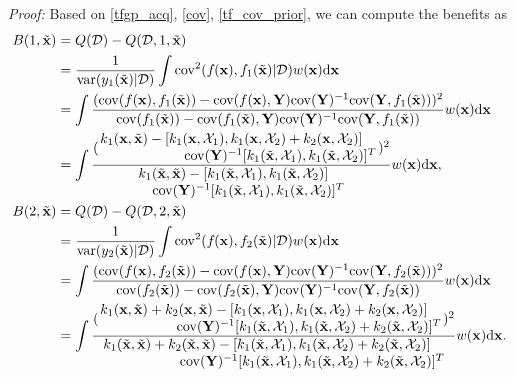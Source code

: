 \documentclass[11pt]{article}
\begin{document}
\textit{Proof:} 
Based on \eqref{tfgp_acq}, \eqref{cov}, \eqref{tf_cov_prior}, we can compute the benefits as
\begin{align}
    B(1, \tilde{\mathbf{x}})  & = Q(\mathcal{D}) - Q(\mathcal{D}, 1, \tilde{\mathbf{x}})
\nonumber \\
    & = \frac{1}{{\rm{var}}(y_1(\tilde{\mathbf{x}})|\mathcal{D})}\int {\rm{cov}}^2(f_{}(\mathbf{x}),f_1(\tilde{\mathbf{x}})|\mathcal{D}) w(\mathbf{x}) \mathrm{d} \mathbf{x}
\nonumber \\
    & = \int \frac{(\mathrm{cov}(f(\mathbf{x}), f_1(\tilde{\mathbf{x}}))-\mathrm{cov}(f(\mathbf{x}), \mathbf{Y})\mathrm{cov}(\mathbf{Y})^{-1} \mathrm{cov}(\mathbf{Y},f_1(\tilde{\mathbf{x}})))^2}
    {\mathrm{cov}(f_1(\tilde{\mathbf{x}})) - \mathrm{cov}(f_1(\tilde{\mathbf{x}}), \mathbf{Y})\mathrm{cov}(\mathbf{Y})^{-1} \mathrm{cov}(\mathbf{Y},f_1(\tilde{\mathbf{x}}))} 
    w(\mathbf{x}) \mathrm{d} \mathbf{x}
\nonumber \\
    & = \int \frac{(\splitfrac{k_1(\mathbf{x}, \tilde{\mathbf{x}})-[k_1(\mathbf{x}, \mathcal{X}_1), k_1(\mathbf{x}, \mathcal{X}_2)+k_2(\mathbf{x}, \mathcal{X}_2)]}{ \mathrm{cov}(\mathbf{Y})^{-1} [k_1(\tilde{\mathbf{x}}, \mathcal{X}_1), k_1(\tilde{\mathbf{x}}, \mathcal{X}_2)]^T})^2}
    {\splitfrac{k_1(\tilde{\mathbf{x}}, \tilde{\mathbf{x}}) - [k_1(\tilde{\mathbf{x}}, \mathcal{X}_1), k_1(\tilde{\mathbf{x}}, \mathcal{X}_2)]} {\mathrm{cov}(\mathbf{Y})^{-1} [k_1(\tilde{\mathbf{x}}, \mathcal{X}_1), k_1(\tilde{\mathbf{x}}, \mathcal{X}_2)]^T}}
    w(\mathbf{x}) \mathrm{d} \mathbf{x},
\\
    B(2, \tilde{\mathbf{x}})  & = Q(\mathcal{D}) - Q(\mathcal{D}, 2, \tilde{\mathbf{x}})
\nonumber \\
    & = \frac{1}{{\rm{var}}(y_2(\tilde{\mathbf{x}})|\mathcal{D})}\int {\rm{cov}}^2(f_{}(\mathbf{x}),f_2(\tilde{\mathbf{x}})|\mathcal{D}) w(\mathbf{x}) \mathrm{d} \mathbf{x}
\nonumber \\
    & = \int \frac{(\mathrm{cov}(f(\mathbf{x}), f_2(\tilde{\mathbf{x}}))-\mathrm{cov}(f(\mathbf{x}), \mathbf{Y})\mathrm{cov}(\mathbf{Y})^{-1} \mathrm{cov}(\mathbf{Y},f_2(\tilde{\mathbf{x}})))^2}
    {\mathrm{cov}(f_2(\tilde{\mathbf{x}})) - \mathrm{cov}(f_2(\tilde{\mathbf{x}}), \mathbf{Y})\mathrm{cov}(\mathbf{Y})^{-1} \mathrm{cov}(\mathbf{Y},f_2(\tilde{\mathbf{x}}))} 
    w(\mathbf{x}) \mathrm{d} \mathbf{x}
\nonumber \\
    & = \int \frac{(\splitfrac{k_1(\mathbf{x}, \tilde{\mathbf{x}}) + k_2(\mathbf{x}, \tilde{\mathbf{x}}) -[k_1(\mathbf{x}, \mathcal{X}_1), k_1(\mathbf{x}, \mathcal{X}_2)+k_2(\mathbf{x}, \mathcal{X}_2)]}{\mathrm{cov}(\mathbf{Y})^{-1} [k_1(\tilde{\mathbf{x}}, \mathcal{X}_1), k_1(\tilde{\mathbf{x}}, \mathcal{X}_2) + k_2(\tilde{\mathbf{x}}, \mathcal{X}_2)]^T})^2}
    {\splitfrac{k_1(\tilde{\mathbf{x}}, \tilde{\mathbf{x}}) + k_2(\tilde{\mathbf{x}}, \tilde{\mathbf{x}}) - [k_1(\tilde{\mathbf{x}}, \mathcal{X}_1), k_1(\tilde{\mathbf{x}}, \mathcal{X}_2) + k_2(\tilde{\mathbf{x}}, \mathcal{X}_2)] }{\mathrm{cov}(\mathbf{Y})^{-1} [k_1(\tilde{\mathbf{x}}, \mathcal{X}_1), k_1(\tilde{\mathbf{x}}, \mathcal{X}_2) + k_2(\tilde{\mathbf{x}}, \mathcal{X}_2)]^T}} 
    w(\mathbf{x}) \mathrm{d} \mathbf{x}.
\label{tfgp_acq_extreme}
\end{align}
\end{document}
